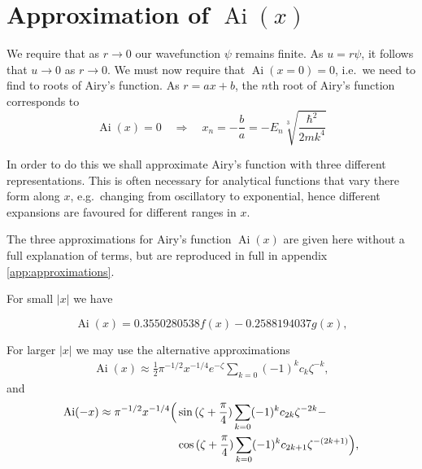\documentclass[]{article}
\renewcommand{\mod}[1]{\ensuremath{\lvert {#1} \rvert}}
\newcommand{\Ai}[1]{\ensuremath{\operatorname{Ai}({#1})}}
\begin{document}
\footnotetext{$\Ai{x} \to 0$ as $x \to \pm\infty$.}

\section{Approximation of \Ai{x}}\label{sec:approximation}

We require that as $r \to 0$ our wavefunction $\psi$ remains finite. As $u = r\psi$, it follows that $u \to 0$ as $r \to 0$. We must now require that $\Ai{x = 0} = 0$, i.e.\ we need to find to roots of Airy's function. As $r = ax + b$, the $n$th root of Airy's function corresponds to
\begin{equation}\label{eqn:rootexpression}
\Ai{x} = 0 \quad\Rightarrow\quad x_{n} = -\frac{b}{a} = -E_{n}\sqrt[3]{\frac{\hbar^{2}}{2mk^{4}}}
\end{equation}

In order to do this we shall approximate Airy's function with three different representations. This is often necessary for analytical functions that vary there form along $x$, e.g.\ changing from oscillatory to exponential, hence different expansions are favoured for different ranges in $x$.

The three approximations for Airy's function $\Ai{x}$ are given here without a full explanation of terms, but are reproduced in full in appendix \ref{app:approximations}.

For small $\mod{x}$ we have~\cite{ref:abramowitz}

\begin{equation}\label{eqn:airyfirst}
\Ai{x} = 0.3550280538f(x) - 0.2588194037g(x),
\end{equation}

For larger $\mod{x}$ we may use the alternative approximations
\begin{align}\label{eqn:airysecond}
\Ai{x} \approx \frac{1}{2}\pi^{-1/2}x^{-1/4}e^{-\zeta} \sum\limits_{k=0} (-1)^{k}c_{k}\zeta^{-k},
\end{align}
and
\begin{equation}\label{eqn:airythird}
	\begin{split}
		\Ai{-x} \approx \pi^{-1/2}x^{-1/4}
		\Bigl(
			&\sin{(\zeta + \frac{\pi}{4})}\sum\limits_{k=0}(-1)^{k}c_{2k}\zeta^{-2k} -\\
			&\cos{(\zeta + \frac{\pi}{4})}\sum\limits_{k=0}(-1)^{k}c_{2k+1}\zeta^{-(2k+1)}
		\Bigr),
	\end{split}
\end{equation}
\end{document}

